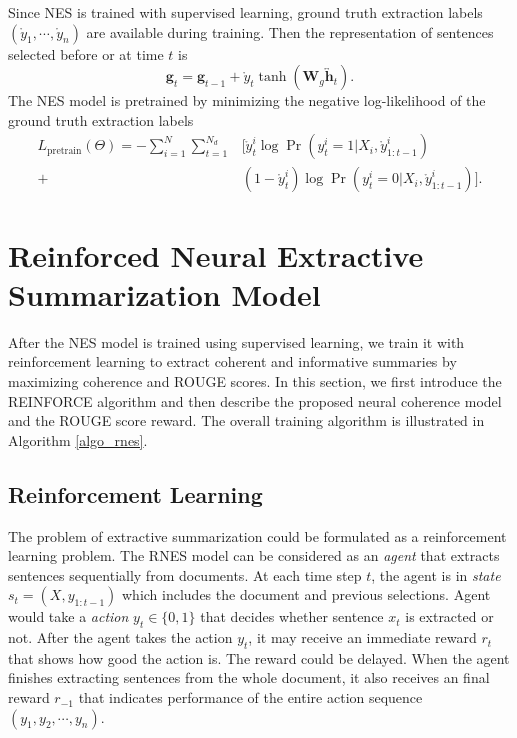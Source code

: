 \documentclass[letterpaper]{article} %
\begin{document}
	Since NES is trained with supervised learning, ground truth extraction labels $(\mathring{y}_1, \cdots, \mathring{y}_n)$ are available during training. Then the representation of sentences selected before or at time $t$ is
	\begin{equation*}
	\mathbf{g}_t =  \mathbf{g}_{t-1} + \mathring{y}_t \tanh (\mathbf{W}_{g} \overleftrightarrow{\mathbf{h}}_t) .
	\end{equation*}
	The NES model is pretrained by minimizing the negative log-likelihood of the ground truth extraction labels
	\begin{align*}
	L_{\text{pretrain}}(\Theta) = - \sum_{i=1}^{N} \sum_{t=1}^{N_d} &\big[ \mathring{y}_t^i \log \Pr(y_t^i=1|X_i, \mathring{y}_{1:t-1}^i)\\ 
	 + & (1 - \mathring{y}_t^i) \log \Pr(y_t^i=0|X_i, \mathring{y}_{1:t-1}^i)\big] .
	\end{align*}
	
	\section{Reinforced Neural Extractive Summarization Model}
	\label{sec:rl}
    After the NES model is trained using supervised learning, we train it with reinforcement learning to extract coherent and informative summaries by maximizing coherence and ROUGE scores. In this section, we first introduce the REINFORCE algorithm and then describe the proposed neural coherence model and the ROUGE score reward. The overall training algorithm is illustrated in Algorithm \ref{algo_rnes}.

	\subsection{Reinforcement Learning} 

	The problem of extractive summarization could be formulated as a reinforcement learning problem. The RNES model can be considered as an \emph{agent} that extracts sentences sequentially from documents. At each time step $t$, the agent is in \emph{state} $s_t = (X, y_{1:t-1})$ which includes the document and previous selections. Agent would take a \emph{action} $y_t \in \{0,1\}$ that decides whether sentence $x_t$ is extracted or not. After the agent takes the action $y_t$, it may receive an immediate reward $r_{t}$ that shows how good the action is. The reward could be delayed. When the agent finishes extracting sentences from the whole document, it also receives an final reward $r_{-1}$ that indicates performance of the entire action sequence $(y_1, y_2, \cdots, y_n)$.
	
\end{document}
